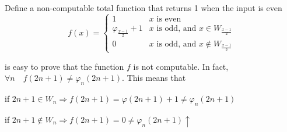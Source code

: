 \begin{exercise}
  Define a non-computable total function that returns 1 when the input
  is even
  \[
    f(x) = \begin{cases}
      1 & x \mbox{ is even} \\
      \varphi_{\frac{x-1}{2}} + 1 & x \mbox{ is odd, and } x \in
      W_{\frac{x-1}{2}} \\
      0 & x \mbox{ is odd, and } x \notin W_{\frac{x-1}{2}}
    \end{cases}
  \]

  is easy to prove that the function $f$ is not computable. In fact,
  $\forall n \quad f(2n + 1) \neq \varphi_n(2n+1)$. This means that

  if
  $2n+1 \in W_n \Rightarrow f(2n+1) = \varphi(2n+1) + 1 \neq
  \varphi_n(2n+1)$

  if
  $2n+1 \notin W_n \Rightarrow f(2n+1) = 0 \neq \varphi_n(2n+1)
  \uparrow $

\end{exercise}



